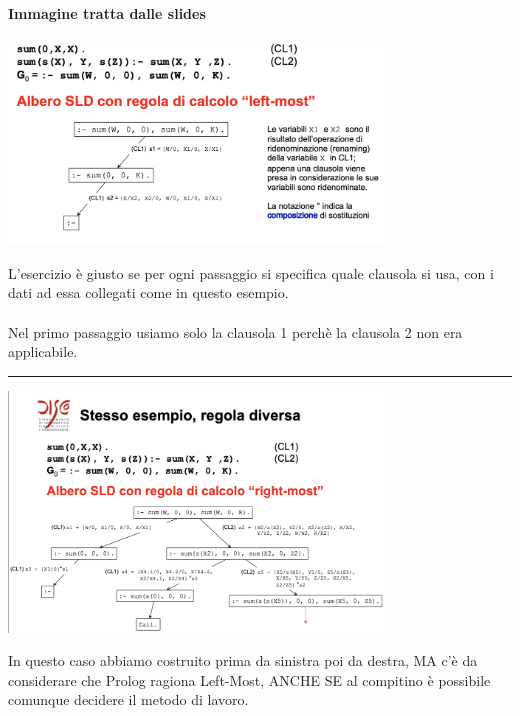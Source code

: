 \documentclass[12pt, a4paper, openany, oneside]{book}
\begin{document}
\paragraph{Immagine tratta dalle slides}
\begin{center}
\includegraphics[width=0.75\textwidth]{8}
\end{center}
L'esercizio è giusto se per ogni passaggio si specifica quale clausola si usa,
con i dati ad essa collegati come in questo esempio. \\  \\
Nel primo passaggio usiamo solo la clausola 1 perchè la clausola 2 non era 
applicabile. 
\\
{\color{black} \rule{\linewidth}{0.3mm}}
\begin{center}
\includegraphics[width=0.75\textwidth]{9}
\end{center}
In questo caso abbiamo costruito prima da sinistra poi da destra, MA c'è da
considerare che Prolog ragiona Left-Most, ANCHE SE al compitino è possibile
comunque decidere il metodo di lavoro.
\end{document}
